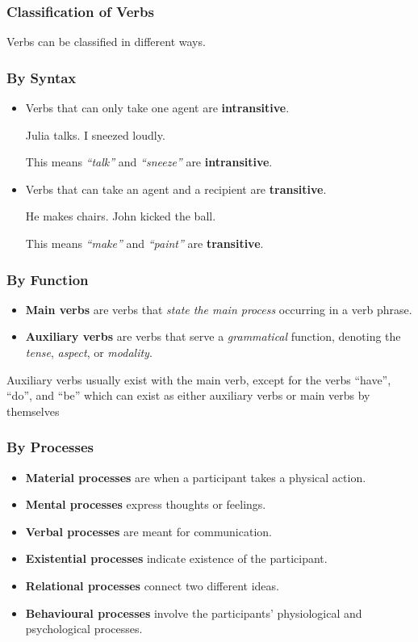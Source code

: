 \documentclass[../main.tex]{subfiles}
\begin{document}
 	\subsubsection{Classification of Verbs}
	Verbs can be classified in different ways. 
	
	\subsubsection*{By Syntax}
	\begin{itemize}
		\item Verbs that can only take one agent are \textbf{intransitive}.
		\begin{exe}
			\ex Julia talks.
			\ex I sneezed loudly.
		\end{exe}
		This means \textit{``talk''} and \textit{``sneeze''} are \textbf{intransitive}.
		\item Verbs that can take an agent and a recipient are \textbf{transitive}.
		\begin{exe}
			\ex He makes chairs.
			\ex[*] {He makes.}
			\ex John kicked the ball.
			\ex[*] {John kicked.}
		\end{exe}
		This means \textit{``make''} and \textit{``paint''} are \textbf{transitive}.
	\end{itemize}
	
	\subsubsection*{By Function}
	\begin{itemize}
		\item \textbf{Main verbs} are verbs that \textit{state the main process} occurring in a verb phrase.
		\item \textbf{Auxiliary verbs} are verbs that serve a \textit{grammatical} function, denoting the \textit{tense}, \textit{aspect}, or \textit{modality}.
	\end{itemize}
	Auxiliary verbs usually exist with the main verb, except for the verbs ``have'', ``do'', and ``be'' which can exist as either auxiliary verbs or main verbs by themselves 

	\subsubsection*{By Processes}
	\begin{itemize}
		\item \textbf{Material processes} are when a participant takes a physical action.
		\item \textbf{Mental processes} express thoughts or feelings.
		\item \textbf{Verbal processes} are meant for communication.
		\item \textbf{Existential processes} indicate existence of the participant.
		\item \textbf{Relational processes} connect two different ideas.
		\item \textbf{Behavioural processes} involve the participants' physiological and psychological processes.
	\end{itemize}
\end{document}
